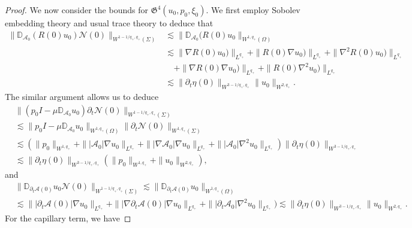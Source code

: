 \documentclass[letterpaper,reqno,10pt,twoside]{amsart}
\theoremstyle{definition}
\theoremstyle{remark}
\def\p{\partial}
\def\Om{\Omega}
\begin{document}
\begin{appendix}
\begin{proof}
				We now consider the bounds for $\mathfrak{G}^4(u_0,p_0,\xi_0)$. We first employ Sobolev embedding theory and usual trace theory to deduce that
				\begin{equation}\label{est:initial_g41}
					\begin{aligned}
						\|\mathbb{D}_{\mathcal{A}_0}(R(0)u_0)\mathcal{N}(0)\|_{W^{1-1/q_+, q_+}(\Sigma)}&\lesssim \|\mathbb{D}_{\mathcal{A}_0}(R(0)u_0\|_{W^{1, q_+}(\Om)}\\
						&\lesssim \|\nabla R(0)u_0)\|_{L^{q_+}}+\| R(0)\nabla u_0)\|_{L^{q_+}}+\|\nabla^2 R(0)u_0)\|_{L^{q_+}}\\
						&\quad+\|\nabla R(0)\nabla u_0)\|_{L^{q_+}}+\|R(0)\nabla^2 u_0)\|_{L^{q_+}}\\
						&\lesssim \|\p_t\eta(0)\|_{W^{3-1/q_+,q_+}}\|u_0\|_{W^{2,q_+}}.
					\end{aligned}
				\end{equation}
				The similar argument allows us to deduce
				\begin{equation}\label{est:initial_g42}
					\begin{aligned}
						&\|(p_0I-\mu\mathbb{D}_{\mathcal{A}_0}u_0)\p_t\mathcal{N}(0)\|_{W^{1-1/q_+, q_+}(\Sigma)}\\
						&\lesssim \|p_0I-\mu\mathbb{D}_{\mathcal{A}_0}u_0\|_{W^{1, q_+}(\Om)}\|\p_t\mathcal{N}(0)\|_{W^{1, q_+}(\Sigma)}\\
						&\lesssim (\|p_0\|_{W^{1,q_+}}+\||\mathcal{A}_0|\nabla u_0\|_{L^{q_+}}+\||\nabla\mathcal{A}_0|\nabla u_0\|_{L^{q_+}}+\||\mathcal{A}_0|\nabla^2u_0\|_{L^{q_+}})\|\p_t\eta(0)\|_{W^{3-1/q_+,q_+}}\\
						&\lesssim \|\p_t\eta(0)\|_{W^{3-1/q_+,q_+}}(\|p_0\|_{W^{1,q_+}}+\|u_0\|_{W^{2,q_+}}),
					\end{aligned}
				\end{equation}
				and
				\begin{equation}\label{est:initial_g43}
					\begin{aligned}
						&\|\mathbb{D}_{\p_t\mathcal{A}(0)}u_0\mathcal{N}(0)\|_{W^{1-1/q_+, q_+}(\Sigma)}\lesssim \|\mathbb{D}_{\p_t\mathcal{A}(0)}u_0\|_{W^{1, q_+}(\Om)}\\
						&\lesssim \||\p_t\mathcal{A}(0)|\nabla u_0\|_{L^{q_+}}+\||\nabla\p_t\mathcal{A}(0)|\nabla u_0\|_{L^{q_+}}+\||\p_t\mathcal{A}_0|\nabla^2u_0\|_{L^{q_+}})\lesssim \|\p_t\eta(0)\|_{W^{3-1/q_+,q_+}}\|u_0\|_{W^{2,q_+}}.
					\end{aligned}
				\end{equation}
				For the capillary term, we have

\end{proof}
\end{appendix}
\end{document}
